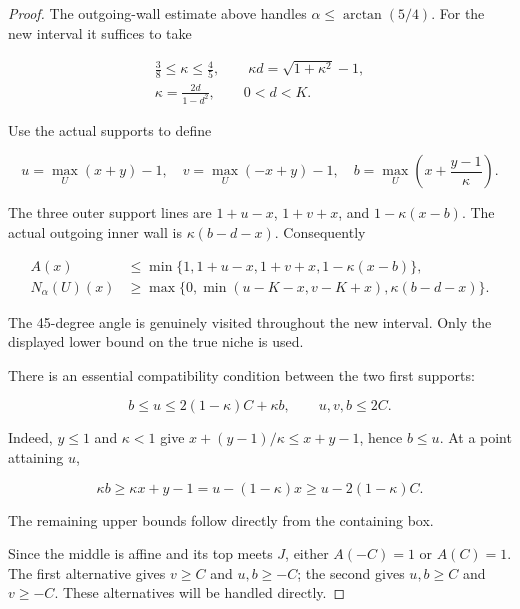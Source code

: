 \begin{proof}
The outgoing-wall estimate above handles
\(\alpha\le\arctan(5/4)\). For the new interval it suffices to take

\begin{equation}\label{eq:partial-at-3}
\begin{gathered}
\frac38\le\kappa\le\frac45,\qquad
\kappa d=\sqrt{1+\kappa^2}-1,\\
\kappa=\frac{2d}{1-d^2},\qquad 0<d<K.
\end{gathered}
\end{equation}

Use the actual supports to define

\begin{equation}\label{eq:partial-at-4}
u=\max_U(x+y)-1,\quad v=\max_U(-x+y)-1,\quad
b=\max_U\left(x+\frac{y-1}{\kappa}\right).
\end{equation}

The three outer support lines are
\(1+u-x\), \(1+v+x\), and \(1-\kappa(x-b)\). The actual outgoing
inner wall is \(\kappa(b-d-x)\). Consequently

\begin{equation}\label{eq:partial-at-5}
\begin{aligned}
A(x)&\le \min\{1,1+u-x,1+v+x,1-\kappa(x-b)\},\\
N_\alpha(U)(x)&\ge
\max\{0,\min(u-K-x,v-K+x),\kappa(b-d-x)\}.
\end{aligned}
\end{equation}

The 45-degree angle is genuinely visited throughout the new interval.
Only the displayed lower bound on the true niche is used.

There is an essential compatibility condition between the two first
supports:

\begin{equation}\label{eq:partial-at-6}
\boxed{b\le u\le 2(1-\kappa)C+\kappa b,
\qquad u,v,b\le2C.}
\end{equation}

Indeed, \(y\le1\) and \(\kappa<1\) give
\(x+(y-1)/\kappa\le x+y-1\), hence \(b\le u\). At a point attaining
\(u\),

\[
\kappa b\ge\kappa x+y-1=u-(1-\kappa)x
\ge u-2(1-\kappa)C.
\]

The remaining upper bounds follow directly from the containing box.

Since the middle is affine and its top meets \(J\), either
\(A(-C)=1\) or \(A(C)=1\). The first alternative gives
\(v\ge C\) and \(u,b\ge-C\); the second gives \(u,b\ge C\) and
\(v\ge-C\). These alternatives will be handled directly.


\end{proof}
